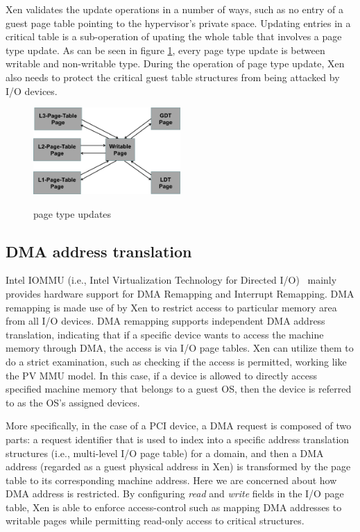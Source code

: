 Xen validates the update operations in a number of ways, such as no entry of a guest page table pointing to the hypervisor's private space. Updating entries in a critical table is a sub-operation of upating the whole table that involves a page type update. As can be seen in figure \ref{fig:page-type-updates}, every page type update is between writable and non-writable type. During the operation of page type update, Xen also needs to protect the critical guest table structures from being attacked by I/O devices.

\begin{figure}[ht]
\centering
\includegraphics[width=0.5\textwidth]{image/background/page-type-updates.png} \\
\caption{page type updates}
\label{fig:page-type-updates}
\end{figure}

\subsection{DMA address translation}

Intel IOMMU (i.e., Intel Virtualization Technology for Directed I/O)~\cite{intelvt} mainly provides hardware support for DMA Remapping and Interrupt Remapping. DMA remapping is made use of by Xen to restrict access to particular memory area from all I/O devices. DMA remapping supports independent DMA address translation, indicating that if a specific device wants to access the machine memory through DMA, the access is via I/O page tables. Xen can utilize them to do a strict examination, such as checking if the access is permitted, working like the PV MMU model. In this case, if a device is allowed to directly access specified machine memory that belongs to a guest OS, then the device is referred to as the OS's assigned devices.

More specifically, in the case of a PCI device, a DMA request is composed of two parts: a request identifier that is used to index into a specific address translation structures (i.e., multi-level I/O page table) for a domain, and then a DMA address (regarded as a guest physical address in Xen) is transformed by the page table to its corresponding machine address. Here we are concerned about how DMA address is restricted. By configuring \emph{read} and \emph{write} fields in the I/O page table, Xen is able to enforce access-control such as mapping DMA addresses to writable pages while permitting read-only access to critical structures.

